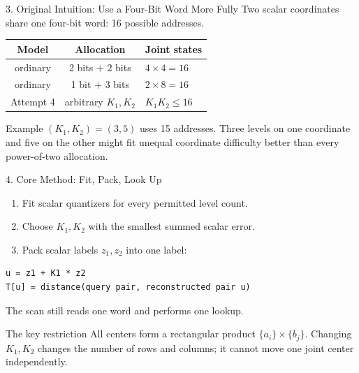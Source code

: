 \documentclass[aspectratio=169]{beamer}
\begin{document}
\begin{frame}{3. Original Intuition: Use a Four-Bit Word More Fully}
Two scalar coordinates share one four-bit word: 16 possible addresses.
\begin{center}
\begin{tabular}{ccl}
\toprule
Model & Allocation & Joint states\\
\midrule
ordinary & 2 bits $+$ 2 bits & $4\times4=16$\\
ordinary & 1 bit $+$ 3 bits & $2\times8=16$\\
Attempt 4 & arbitrary $K_1,K_2$ & $K_1K_2\leq16$\\
\bottomrule
\end{tabular}
\end{center}
\begin{block}{Example}
$(K_1,K_2)=(3,5)$ uses 15 addresses. Three levels on one coordinate and five on the other might fit unequal coordinate difficulty better than every power-of-two allocation.
\end{block}
\end{frame}

\begin{frame}[fragile]{4. Core Method: Fit, Pack, Look Up}
\begin{enumerate}
  \item Fit scalar quantizers for every permitted level count.
  \item Choose $K_1,K_2$ with the smallest summed scalar error.
  \item Pack scalar labels $z_1,z_2$ into one label:
\end{enumerate}
\begin{verbatim}
u = z1 + K1 * z2
T[u] = distance(query pair, reconstructed pair u)
\end{verbatim}
The scan still reads one word and performs one lookup.
\begin{alertblock}{The key restriction}
All centers form a rectangular product $\{a_i\}\times\{b_j\}$. Changing $K_1,K_2$ changes the number of rows and columns; it cannot move one joint center independently.
\end{alertblock}
\end{frame}
\end{document}
